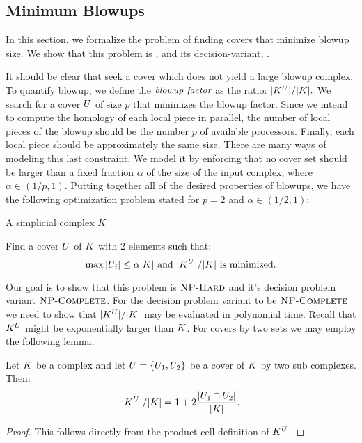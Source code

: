 \subsection{Minimum Blowups}
\label{sec:hardness}
In this section, we formalize the problem of finding covers
that minimize blowup size. We show that this problem is \NPH{}, and its 
decision-variant, \NPC{}.

It should be clear that seek a cover which does not yield a large blowup complex. 
To quantify blowup, we define the $\emph{blowup factor}$ as the ratio: 
$|K^{U}|/|K|.$ We search for a cover $U$ of size $p$ that minimizes the blowup 
factor. Since we intend to compute the homology of each local piece in parallel,
 the number of local pieces of the blowup should be the number $p$ of available 
processors. Finally, each local piece should be approximately the same 
size. There are many ways of modeling this last constraint. 
We model it by enforcing that no cover set should be larger than a fixed fraction
$\alpha$ of the size of the input complex, where $\alpha \in (1/p,1)$. 
Putting together all of the desired properties of blowups, we have the following 
optimization problem stated for $p = 2$ and $\alpha \in (1/2, 1)$:
\begin{description}
\addtolength{\itemsep}{-.7\baselineskip}
\item[\textsc{Problem:}]  \ablp 
\item[\textsc{Instance:}] A simplicial complex $K$
\item[\textsc{Goal:}] Find a cover $U$ of $K$ with $2$ elements such that: 
\[ \max{|U_i|} \leq \alpha|K| \textrm{ and } |K^{U}|/|K| \textrm{ is minimized.} \]
\end{description}
Our goal is to show that this problem is $\textsc{NP-Hard}{}$ and it's decision problem variant $\textsc{NP-Complete}{}$.
For the decision problem variant to be $\textsc{NP-Complete}{}$ we need to show that $|K^{U}|/|K|$ may
be evaluated in polynomial time. Recall that $K^{U}$ might be exponentially larger than $K$. 
For covers by two sets we may employ the following lemma.
\begin{lemma}
\label{lem:char-blowup-sol}
Let $K$ be a complex and let $U = \{U_1, U_2\}$ be a cover of $K$ 
by two sub complexes. Then:
\begin{equation*}
|K^{U}|/|K| = 1 + 2\frac{|U_1 \cap U_2|}{|K|}. 
\end{equation*}
\end{lemma}
\begin{proof}
This follows directly from the product cell definition of $K^U$.
\end{proof}
